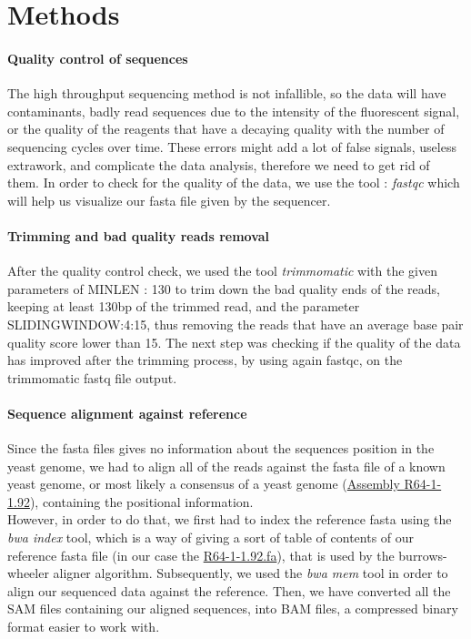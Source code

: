 \documentclass[10pt,a4paper]{article}
\begin{document}
\section*{Methods}

\paragraph{Quality control of sequences} The high throughput sequencing method is not infallible, so the data will have contaminants, badly read sequences due to the intensity of the fluorescent signal, or the quality of the reagents that have a decaying quality with the number of sequencing cycles over time\cite{abnizova_computational_2017}. These errors might add a lot of false signals, useless extrawork, and complicate the data analysis, therefore we need to get rid of them. In order to check for the quality of the data, we use the tool : \textit{fastqc}\cite{andrews2012} which will help us visualize our fasta file given by the sequencer. \\


\paragraph{Trimming and bad quality reads removal } After the quality control check, we used the tool \textit{trimmomatic}\cite{bolger_trimmomatic:_2014} with the given parameters of MINLEN : 130 to trim down the bad quality ends of the reads, keeping at least 130bp of the trimmed read, and the parameter SLIDINGWINDOW:4:15, thus removing the reads that have an average base pair quality score lower than 15. The next step was checking if the quality of the data has improved after the trimming process, by using again fastqc, on the trimmomatic fastq file output.

\paragraph{Sequence alignment against reference} Since the fasta files gives no information about the sequences position in the yeast genome, we had to align all of the reads against the fasta file of a known yeast genome, or most likely a consensus of a yeast genome (\href{https://www.ensembl.org/Saccharomyces_cerevisiae/Info/Index}{Assembly R64-1-1.92}), containing the positional information.\\
 
\noindent However, in order to do that, we first had to index the reference fasta using the \textit{bwa index} tool\cite{li_fast_2010}, which is a way of giving a sort of table of contents of our reference fasta file (in our case the \href{https://www.ensembl.org/Saccharomyces_cerevisiae/Info/Index}{R64-1-1.92.fa}), that is used by the burrows-wheeler aligner algorithm. Subsequently, we used the \textit{bwa mem} tool in order to align our sequenced data against the reference. Then, we have converted all the SAM\cite{li_sequence_2009} files containing our aligned sequences, into BAM files, a compressed binary format easier to work with.
 
\end{document}
